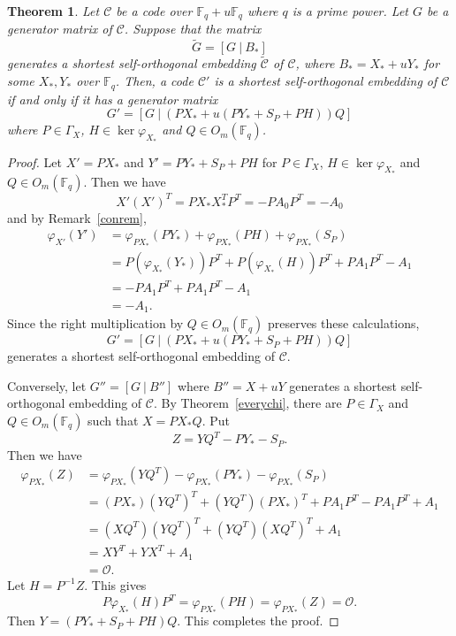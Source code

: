 \documentclass{article}
\newtheorem{theorem}{Theorem}[section]
\theoremstyle{definition}
\theoremstyle{remark}
\begin{document}
\begin{theorem}\label{optimalconstruct}
    Let $\mathcal{C}$ be a code over $\mathbb{F}_q+u\mathbb{F}_q$ where $q$ is a prime power. Let $G$ be a generator matrix of $\mathcal{C}$. Suppose that the matrix
    \[
    \tilde{G}=[G~|~B_*]
    \]
    generates a shortest self-orthogonal embedding $\tilde{\mathcal{C}}$ of $\mathcal{C}$, where $B_*=X_*+uY_*$ for some $X_*, Y_*$ over $\mathbb{F}_q$. Then, a code $\mathcal{C}'$ is a shortest self-orthogonal embedding of $\mathcal{C}$ if and only if it has a generator matrix
    \[
    G'=[G~|~(PX_*+u(PY_*+S_P+PH))Q]
    \]
    where $P\in \Gamma_X$, $H\in \ker\varphi_{X_*}$ and $Q\in O_m(\mathbb{F}_q)$.
\end{theorem}
\begin{proof}
    Let $X'=PX_*$ and $Y'=PY_*+S_P+PH$ for $P\in \Gamma_X$, $H\in \ker\varphi_{X_*}$ and $Q\in O_m(\mathbb{F}_q)$. Then we have
    \[
    X'(X')^T=PX_*X_*^TP^T=-PA_0P^T=-A_0
    \]
    and by Remark~\ref{conrem},
    \begin{align*}
    \varphi_{X'}(Y')&=\varphi_{PX_*}(PY_*)+\varphi_{PX_*}(PH)+\varphi_{PX_*}(S_P)\\&=P(\varphi_{X_*}(Y_*))P^T+P(\varphi_{X_*}(H))P^T+PA_1P^T-A_1\\&=-PA_1P^T+PA_1P^T-A_1\\&=-A_1.
    \end{align*}
    Since the right multiplication by $Q\in O_m(\mathbb{F}_q)$ preserves these calculations,
    \[
    G'=[G~|~(PX_*+u(PY_*+S_P+PH))Q]
    \]
    generates a shortest self-orthogonal embedding of $\mathcal{C}$.

    Conversely, let $G''=[G~|~B'']$ where $B''=X+uY$ generates a shortest self-orthogonal embedding of $\mathcal{C}$. By Theorem~\ref{everychi}, there are $P\in \Gamma_X$ and $Q\in O_m(\mathbb{F}_q)$ such that $X=PX_*Q$. Put
    \[
    Z=YQ^T-PY_*-S_P.
    \]
    Then we have
    \begin{align*}
    \varphi_{PX_*}(Z)&=\varphi_{PX_*}(YQ^T)-\varphi_{PX_*}(PY_*)-\varphi_{PX_*}(S_P)\\&=(PX_*)(YQ^T)^T+(YQ^T)(PX_*)^T+PA_1P^T-PA_1P^T+A_1\\&=(XQ^T)(YQ^T)^T+(YQ^T)(XQ^T)^T+A_1\\
    &=XY^T+YX^T+A_1\\
    &=\mathcal{O}.
    \end{align*}
    Let $H=P^{-1}Z$. This gives
    \[
    P\varphi_{X_*}(H)P^T=\varphi_{PX_*}(PH)=\varphi_{PX_*}(Z)=\mathcal{O}.
    \]
    Then $Y=(PY_*+S_P+PH)Q$. This completes the proof.
\end{proof}
\end{document}
